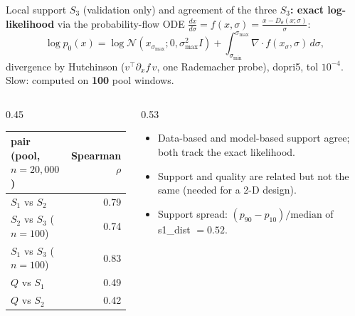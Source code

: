 \documentclass[aspectratio=169,11pt]{beamer}
\begin{document}
\begin{frame}{Local support $S_3$ (validation only) and agreement of the three}
\small
\textbf{$S_3$: exact log-likelihood} via the probability-flow ODE $\frac{dx}{d\sigma}=f(x,\sigma)=\frac{x-D_\theta(x;\sigma)}{\sigma}$:
\[
\log p_0(x)=\log\mathcal N(x_{\sigma_{\max}};0,\sigma_{\max}^2I)+\int_{\sigma_{\min}}^{\sigma_{\max}}\nabla\!\cdot f(x_\sigma,\sigma)\,d\sigma,
\]
divergence by Hutchinson ($v^\top\partial_xf\,v$, one Rademacher probe), dopri5, tol $10^{-4}$. Slow: computed on \textbf{100} pool windows.
\vspace{0.5em}

\begin{columns}[T]
\begin{column}{0.45\linewidth}
\centering
\begin{tabular}{lr}
\toprule
pair (pool, $n=20{,}000$) & Spearman $\rho$\\
\midrule
$S_1$ vs $S_2$ & 0.79\\
$S_2$ vs $S_3$ ($n=100$) & 0.74\\
$S_1$ vs $S_3$ ($n=100$) & 0.83\\
$Q$ vs $S_1$ & 0.49\\
$Q$ vs $S_2$ & 0.42\\
\bottomrule
\end{tabular}
\end{column}
\begin{column}{0.53\linewidth}
\begin{itemize}
\item Data-based and model-based support agree; both track the exact likelihood.
\item Support and quality are related but not the same (needed for a 2-D design).
\item Support spread: $(p_{90}-p_{10})/\text{median}$ of s1\_dist $=0.52$.
\end{itemize}
\end{column}
\end{columns}
\end{frame}
\end{document}
